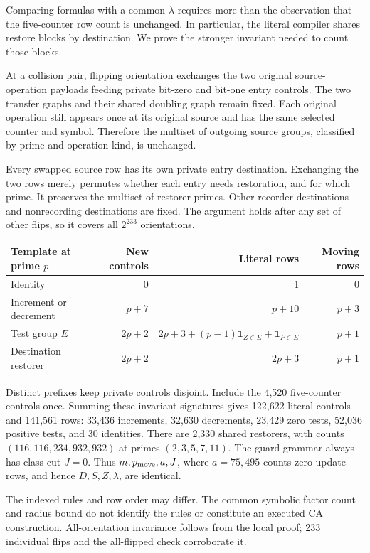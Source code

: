 \documentclass[11pt,a4paper]{article}
\numberwithin{equation}{section}
\newcommand{\lam}{\lambda}
\begin{document}
Comparing formulas with a common $\lam$ requires more than the observation
that the five-counter row count is unchanged. In particular, the literal
compiler shares restore blocks by destination. We prove the stronger
invariant needed to count those blocks.

At a collision pair, flipping orientation exchanges the two original
source-operation payloads feeding private bit-zero and bit-one entry
controls. The two transfer graphs and their shared doubling graph remain
fixed. Each original operation still appears once at its original source
and has the same selected counter and symbol. Therefore the multiset of
outgoing source groups, classified by prime and operation kind, is unchanged.

Every swapped source row has its own private entry destination. Exchanging
the two rows merely permutes whether each entry needs restoration, and for
which prime. It preserves the multiset of restorer primes. Other recorder
destinations and nonrecording destinations are fixed. The argument holds
after any set of other flips, so it covers all $2^{233}$ orientations.

\begin{center}\small
\begin{tabular}{@{}lrrr@{}}
\toprule
Template at prime $p$ & New controls & Literal rows & Moving rows\\
\midrule
Identity & 0 & 1 & 0\\
Increment or decrement & $p+7$ & $p+10$ & $p+3$\\
Test group $E$ & $2p+2$ & $2p+3+(p-1)\mathbf1_{Z\in E}+\mathbf1_{P\in E}$ & $p+1$\\
Destination restorer & $2p+2$ & $2p+3$ & $p+1$\\
\bottomrule
\end{tabular}
\end{center}

Distinct prefixes keep private controls disjoint. Include the 4,520
five-counter controls once. Summing these invariant signatures gives
122,622 literal controls and 141,561 rows: 33,436 increments, 32,630
decrements, 23,429 zero tests, 52,036 positive tests, and 30 identities.
There are 2,330 shared restorers, with counts $(116,116,234,932,932)$ at
primes $(2,3,5,7,11)$. The guard grammar always has class cut $J=0$.
Thus $m,p_{\rm move},a,J$, where $a=75{,}495$ counts zero-update rows,
and hence $D,S,Z,\lam$, are identical.

The indexed rules and row order may differ. The common symbolic factor
count and radius bound do not identify the rules or constitute an executed
CA construction. All-orientation invariance follows from the local proof;
233 individual flips and the all-flipped check corroborate it.
\newpage
\end{document}
